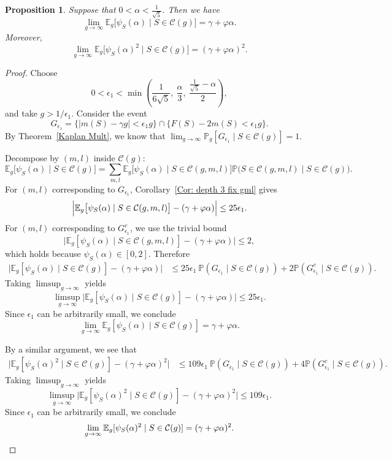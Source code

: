 \documentclass[12pt]{amsart}
\def\E{{\mathbb E}}
\renewcommand{\phi}{\varphi}
\renewcommand{\P}{\mathbb{P}}
\newcommand{\cC}{\mathcal{C}}
\newtheorem{proposition}[theorem]{Proposition}
\begin{document}
\begin{proposition}\label{Prop: small alpha depth 3}
Suppose that $0<\alpha<\frac{1}{\sqrt{5}}$.
Then we have
\[
\lim_{g\to\infty} \E_g \big[\psi_S(\alpha)\mid S\in \cC(g)\big] = \gamma+\phi\alpha. 
\]
Moreover,
\[
\lim_{g\to\infty} \E_g \big[\psi_S(\alpha)^2\mid S\in \cC(g)\big] = (\gamma+\phi\alpha)^2. 
\]
\end{proposition}
\begin{proof}
Choose
\[
0<\epsilon_1<\min\left(\frac{1}{6\sqrt5},\ \frac{\alpha}{3},\ \frac{\frac{1}{\sqrt{5}}-\alpha}{2}\right),
\]
and take $g>1/\epsilon_1$. Consider the event
\[
G_{\epsilon_1}=\big\{|m(S)-\gamma g|<\epsilon_1 g\big\}\cap\big\{F(S)-2m(S)<\epsilon_1 g\big\}.
\]
By Theorem~\ref{Kaplan Mult}, we know that
$\lim_{g\to\infty} \P_g[G_{\epsilon_1}\mid S\in\cC(g)]=1$.



Decompose by $(m,l)$ inside $\cC(g)$:
\[
\E_g\big[\psi_S(\alpha)\mid S\in\cC(g)\big]
=\sum_{m,l}\E_g\big[\psi_S(\alpha)\mid S\in\cC(g,m,l)\big]
\P\big(S\in\cC(g,m,l)\mid S\in\cC(g)\big).
\]
For $(m,l)$ corresponding to $G_{\epsilon_1}$, Corollary~\ref{Cor: depth 3 fix gml} gives
\[
\Bigl|\E_g\big[\psi_S(\alpha)\mid S\in\cC(g,m,l)\big]-(\gamma+\phi\alpha)\Bigr|
\leq 25\epsilon_1.
\]
For $(m,l)$ corresponding to $G_{\epsilon_1}^c$, we use the trivial bound
\[
\big|\E_g[\psi_S(\alpha)\mid S\in\cC(g,m,l)]-(\gamma+\phi\alpha)\big|\leq 2,
\]
which holds because $\psi_S(\alpha)\in[0,2]$.
Therefore
\begin{align*}
\Big|\E_g[\psi_S(\alpha)\mid S\in\cC(g)]-(\gamma+\phi\alpha)\Big|
&\leq 25\epsilon_1\ \P(G_{\epsilon_1}\mid S\in\cC(g))
+2\P(G_{\epsilon_1}^c\mid S\in\cC(g)).
\end{align*}
Taking $\limsup_{g\to\infty}$ yields
\[\limsup_{g\to\infty}\Big|\E_g[\psi_S(\alpha)\mid S\in\cC(g)]-(\gamma+\phi\alpha)\Big|
\leq 25\epsilon_1.\]
Since $\epsilon_1$ can be arbitrarily small, we conclude
\[\lim_{g\to\infty}\E_g[\psi_S(\alpha)\mid S\in\cC(g)]=\gamma+\phi\alpha.\]

By a similar argument, we see that
\begin{align*}
\Big|\E_g[\psi_S(\alpha)^2\mid S\in\cC(g)]-(\gamma+\phi\alpha)^2\Big|
&\leq 109\epsilon_1\ \P(G_{\epsilon_1}\mid S\in\cC(g))
+4\P(G_{\epsilon_1}^c\mid S\in \cC(g)).
\end{align*}
Taking $\limsup_{g\to\infty}$ yields
\[
\limsup_{g\to\infty}\Big|\E_g[\psi_S(\alpha)^2\mid S\in\cC(g)]-(\gamma+\phi\alpha)^2\Big|
\leq 109\epsilon_1.
\]
Since $\epsilon_1$ can be arbitrarily small, we conclude
\[
\lim_{g\to\infty}\E_g[\psi_S(\alpha)^2\mid S\in\cC(g)]=(\gamma+\phi\alpha)^2.\qedhere
\]
\end{proof}
\end{document}
